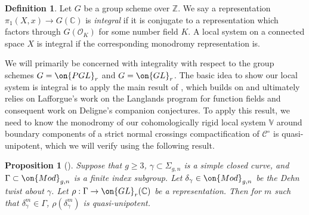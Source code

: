 \documentclass[12 pt]{amsart}
\theoremstyle{plain}
\newtheorem{proposition}[subsubsection]{Proposition}
\theoremstyle{definition}
\newtheorem{definition}[subsubsection]{Definition}
\theoremstyle{remark}
\numberwithin{equation}{section}
\begin{document}
\begin{definition}
	\label{definition:}
	Let $G$ be a group scheme over $\mathbb{Z}$. We say a representation $\pi_1(X, x) \to G(\mathbb C)$ is {\em integral}
if it is conjugate to a representation which factors through $G(\mathscr
O_K)$ for some number field $K$.
A local system on a connected space $X$ is integral if the corresponding monodromy representation is.
\end{definition}
We will primarily be concerned with integrality with respect to the group
schemes $G = \on{PGL}_r$ and $G = \on{GL}_r$.
The basic idea to show our local system is integral is to apply the main result of
\cite{klevdalP:g-rigid-local-systems-are-integral}, which builds on \cite{esnault2018cohomologically} and ultimately relies on Lafforgue's work on the Langlands program for function fields and consequent work on Deligne's companion conjectures.
To apply this result, we need to know the monodromy of our cohomologically rigid
local system $\mathbb{V}$ around boundary components of a strict normal crossings compactification of $\mathscr{C}^\circ$
is quasi-unipotent, which we will verify using the following result.

\begin{proposition}[]
			\label{proposition:quasi-unipotent-dehn}
	Suppose that $g \geq 3$, $\gamma \subset \Sigma_{g,n}$ is a simple closed curve, 
	and $\Gamma\subset \on{Mod}_{g,n}$ is a 
finite index subgroup. Let $\delta_\gamma\in\on{Mod}_{g,n}$ be the Dehn twist about $\gamma$. Let $\rho: \Gamma\to \on{GL}_r(\mathbb{C})$ be a representation. Then for $m$ such that $\delta_\gamma^m\in \Gamma$, $\rho(\delta_\gamma^m)$ is quasi-unipotent.
\end{proposition}
\end{document}
